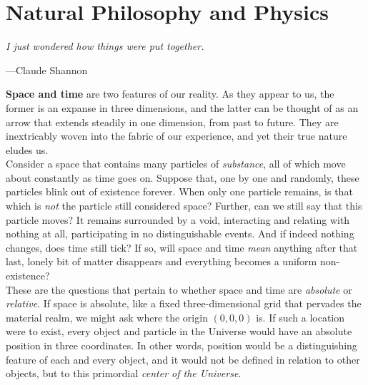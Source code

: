 

\toclineskip
\section{Natural Philosophy and Physics}

\vspace{4mm}
\begin{displayquote}
	\textit{I just wondered how things were put together.}
	\vspace{2mm}
	\begin{flushright}
		---Claude Shannon
	\end{flushright}
\end{displayquote}
\vspace{4mm}

\textbf{Space and time} are two features of our reality. As they appear to us, the former is an expanse in three dimensions, and the latter can be thought of as an arrow that extends steadily in one dimension, from past to future. They are inextricably woven into the fabric of our experience, and yet their true nature eludes us. \\

Consider a space that contains many particles of \textit{substance}, all of which move about constantly as time goes on. Suppose that, one by one and randomly, these particles blink out of existence forever. When only one particle remains, is that which is \textit{not} the particle still considered space? Further, can we still say that this particle moves? It remains surrounded by a void, interacting and relating with nothing at all, participating in no distinguishable events. And if indeed nothing changes, does time still tick? If so, will space and time \textit{mean} anything after that last, lonely bit of matter disappears and everything becomes a uniform non-existence? \\

These are the questions that pertain to whether space and time are \textit{absolute} or \textit{relative}. If space is absolute, like a fixed three-dimensional grid that pervades the material realm, we might ask where the origin $(0,0,0)$ is. If such a location were to exist, every object and particle in the Universe would have an absolute position in three coordinates. In other words, position would be a distinguishing feature of each and every object, and it would not be defined in relation to other objects, but to this primordial \textit{center of the Universe}. \\

